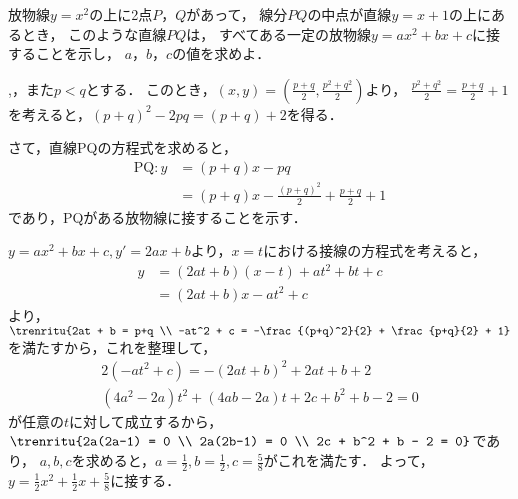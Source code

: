 
\begin{problem}
  放物線$y=x^2$の上に2点$P$，$Q$があって，
線分$PQ$の中点が直線$y=x+1$の上にあるとき，
このような直線$PQ$は，
すべてある一定の放物線$y=ax^2+bx+c$に接することを示し，
$a$，$b$，$c$の値を求めよ．
\end{problem}

,，また$p<q$とする．
このとき，$(x,y) = \left( \frac{p+q}{2}, \frac{p^2+q^2}{2} \right)$より，
$\frac{p^2+q^2}{2} = \frac{p+q}{2}+1$を考えると，$(p+q)^2 -2pq = (p+q)+2$を得る．

さて，直線PQの方程式を求めると，
\begin{align*}
  \mathrm{PQ}: y &= (p+q)x -pq \\
  &= (p+q)x- \frac{(p+q)^2}{2} + \frac{p+q}{2} + 1
\end{align*}
であり，PQがある放物線に接することを示す．

$y = ax^2 + bx + c, y' = 2ax + b$より，$x=t$における接線の方程式を考えると，
\begin{align*}
  y &= (2at+b)(x-t) + at^2 + bt + c \\
  &= (2at+b)x - at^2 + c
\end{align*}
より，$\trenritu{2at + b = p+q \\ -at^2 + c = -\frac{(p+q)^2}{2} + \frac{p+q}{2} + 1}$を満たすから，これを整理して，
\begin{align*}
  2(-at^2 + c) = -(2at + b)^2 + 2at + b + 2 \\
  (4a^2- 2a)t^2 + (4ab - 2a)t + 2c + b^2 + b - 2 = 0
\end{align*}
が任意の$t$に対して成立するから，
$\trenritu{2a(2a-1) = 0 \\ 2a(2b-1) = 0 \\ 2c + b^2 + b - 2 = 0}$であり，
$a,b,c$を求めると，$a= \frac12, b = \frac12 , c = \frac58$がこれを満たす．
よって，$y = \frac12 x^2 + \frac12 x + \frac58$に接する．

